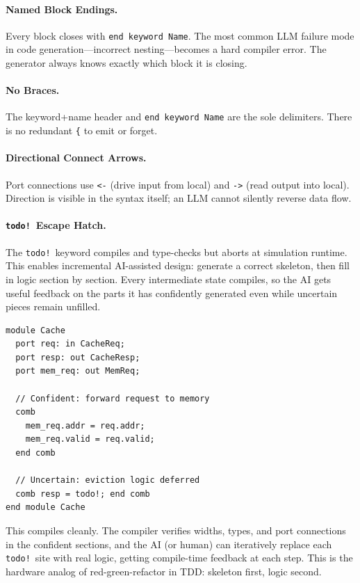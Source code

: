 \documentclass[manuscript]{acmart}
\begin{document}
\paragraph{Named Block Endings.} Every block closes with \texttt{end keyword Name}. The most common LLM failure mode in code generation---incorrect nesting---becomes a hard compiler error. The generator always knows exactly which block it is closing.

\paragraph{No Braces.} The keyword+name header and \texttt{end keyword Name} are the sole delimiters. There is no redundant \texttt{\{} to emit or forget.

\paragraph{Directional Connect Arrows.} Port connections use \texttt{<-} (drive input from local) and \texttt{->} (read output into local). Direction is visible in the syntax itself; an LLM cannot silently reverse data flow.

\paragraph{\texttt{todo!}\ Escape Hatch.} The \texttt{todo!}\ keyword compiles and type-checks but aborts at simulation runtime. This enables incremental AI-assisted design: generate a correct skeleton, then fill in logic section by section. Every intermediate state compiles, so the AI gets useful feedback on the parts it has confidently generated even while uncertain pieces remain unfilled.

\begin{lstlisting}[language=Arch,caption={Partial implementation with \texttt{todo!}},label={lst:todo}]
module Cache
  port req: in CacheReq;
  port resp: out CacheResp;
  port mem_req: out MemReq;

  // Confident: forward request to memory
  comb
    mem_req.addr = req.addr;
    mem_req.valid = req.valid;
  end comb

  // Uncertain: eviction logic deferred
  comb resp = todo!; end comb
end module Cache
\end{lstlisting}

This compiles cleanly. The compiler verifies widths, types, and port connections in the confident sections, and the AI (or human) can iteratively replace each \texttt{todo!}\ site with real logic, getting compile-time feedback at each step. This is the hardware analog of red-green-refactor in TDD: skeleton first, logic second.
\end{document}
